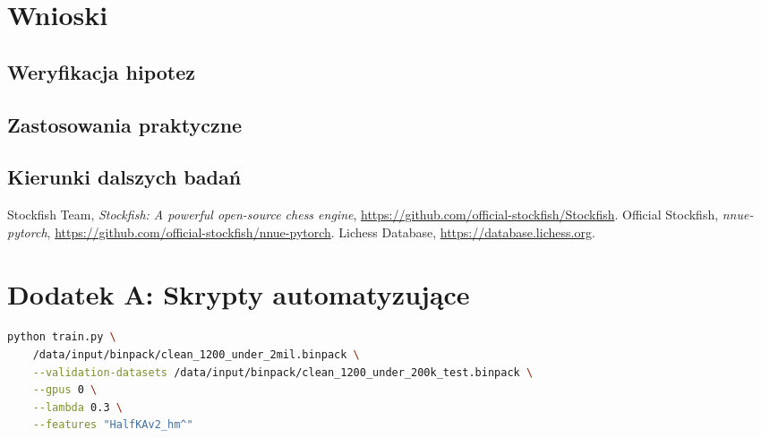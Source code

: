 \documentclass[12pt,a4paper]{report}
\begin{document}

\chapter{Wnioski}

\section{Weryfikacja hipotez}

\section{Zastosowania praktyczne}


\section{Kierunki dalszych badań}

\begin{thebibliography}{99}
     Stockfish Team, \textit{Stockfish: A powerful open-source chess engine}, \url{https://github.com/official-stockfish/Stockfish}.
     Official Stockfish, \textit{nnue-pytorch}, \url{https://github.com/official-stockfish/nnue-pytorch}.
     Lichess Database, \url{https://database.lichess.org}.
\end{thebibliography}

\listoffigures
\listoftables

\chapter*{Dodatek A: Skrypty automatyzujące}

\begin{lstlisting}[language=bash, caption=Przykładowe uruchomienie treningu]
python train.py \
    /data/input/binpack/clean_1200_under_2mil.binpack \
    --validation-datasets /data/input/binpack/clean_1200_under_200k_test.binpack \
    --gpus 0 \
    --lambda 0.3 \
    --features "HalfKAv2_hm^"
\end{lstlisting}
\end{document}
